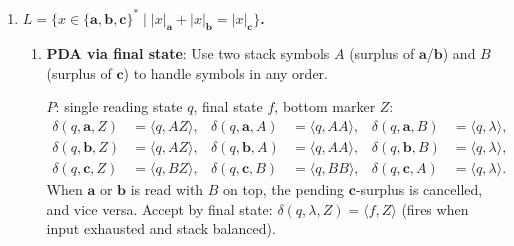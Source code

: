 \begin{enumerate}[{10.}1. ]
\begin{enumerate}
\item \textbf{PDA via empty stack}: Same idea, but pop $Z$ at the end instead of moving to a final state.

\item \textbf{Counting automaton}: No; a counting automaton has fixed counting capacity and cannot track the unbounded sum $i+j$.

\item \textbf{DPDA}: Yes. The DPDA reads $\pmb{a}$s (pushing), then $\pmb{b}$s (pushing), then $\pmb{c}$s (popping), accepting when the stack is empty at end of input. Since the transitions are deterministic at each step, a DPDA exists.

\item \textbf{Grammar from PDA} (using Definition 10.7): The grammar derived from the PDA in part (a) produces variables $\langle q_i, A, q_j\rangle$ meaning ``starting in state $q_i$ with $A$ on top of the stack, the PDA moves to state $q_j$ and empties the stack.'' The specific grammar productions are derived systematically from the transition function.
\end{enumerate}

\item \textbf{$L=\{x\in\{\pmb{a},\pmb{b},\pmb{c}\}^* \mid |x|_{\pmb{a}}+|x|_{\pmb{b}}=|x|_{\pmb{c}}\}$.}

\begin{enumerate}
\item \textbf{PDA via final state}: Use two stack symbols $A$ (surplus of $\pmb{a}$/$\pmb{b}$) and $B$ (surplus of $\pmb{c}$) to handle symbols in any order.

$P$: single reading state $q$, final state $f$, bottom marker $Z$:
\begin{align*}
\delta(q,\pmb{a},Z)&=\langle q,AZ\rangle, & \delta(q,\pmb{a},A)&=\langle q,AA\rangle, & \delta(q,\pmb{a},B)&=\langle q,\lambda\rangle,\\
\delta(q,\pmb{b},Z)&=\langle q,AZ\rangle, & \delta(q,\pmb{b},A)&=\langle q,AA\rangle, & \delta(q,\pmb{b},B)&=\langle q,\lambda\rangle,\\
\delta(q,\pmb{c},Z)&=\langle q,BZ\rangle, & \delta(q,\pmb{c},B)&=\langle q,BB\rangle, & \delta(q,\pmb{c},A)&=\langle q,\lambda\rangle.
\end{align*}
When $\pmb{a}$ or $\pmb{b}$ is read with $B$ on top, the pending $\pmb{c}$-surplus is cancelled, and vice versa.
Accept by final state: $\delta(q,\lambda,Z)=\langle f,Z\rangle$ (fires when input exhausted and stack balanced).


\end{enumerate}
\end{enumerate}
